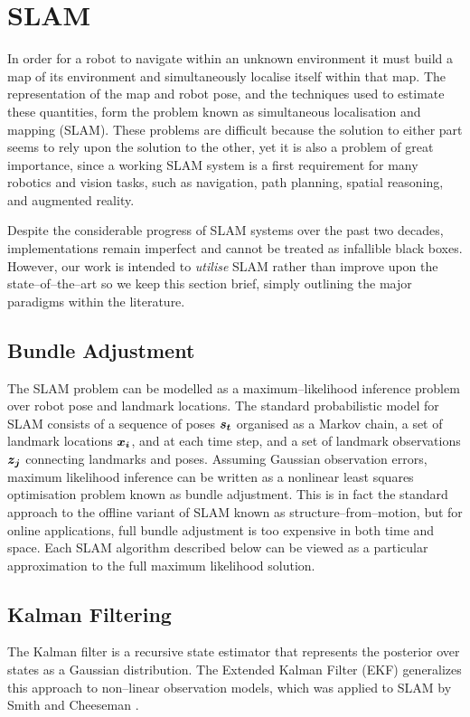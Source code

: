 \section{SLAM}
In order for a robot to navigate within an unknown environment it must
build a map of its environment and simultaneously localise itself
within that map. The representation of the map and robot pose, and the
techniques used to estimate these quantities, form the problem known
as simultaneous localisation and mapping (SLAM). These problems are
difficult because the solution to either part seems to rely upon the
solution to the other, yet it is also a problem of great importance,
since a working SLAM system is a first requirement for many robotics
and vision tasks, such as navigation, path planning, spatial
reasoning, and augmented reality.

Despite the considerable progress of SLAM systems over the past two
decades, implementations remain imperfect and cannot be treated as
infallible black boxes. However, our work is intended to
\textit{utilise} SLAM rather than improve upon the state--of--the--art
so we keep this section brief, simply outlining the major paradigms
within the literature.

\subsection{Bundle Adjustment}

The SLAM problem can be modelled as a maximum--likelihood inference
problem over robot pose and landmark locations. The standard
probabilistic model for SLAM consists of a sequence of poses
$\vect{s_t}$ organised as a Markov chain, a set of landmark locations
$\vect{x_i}$, and at each time step, and a set of landmark
observations $\vect{z_j}$ connecting landmarks and poses. Assuming
Gaussian observation errors, maximum likelihood inference can be
written as a nonlinear least squares optimisation problem known as
bundle adjustment. This is in fact the standard approach to the
offline variant of SLAM known as structure--from--motion, but for
online applications, full bundle adjustment is too expensive in both
time and space. Each SLAM algorithm described below can be viewed as a
particular approximation to the full maximum likelihood solution.

\subsection{Kalman Filtering}
The Kalman filter \cite{Kalman60} is a recursive state estimator that
represents the posterior over states as a Gaussian distribution. The
Extended Kalman Filter (EKF) generalizes this approach to non--linear
observation models, which was applied to SLAM by Smith and Cheeseman
\cite{Smith87}. 

